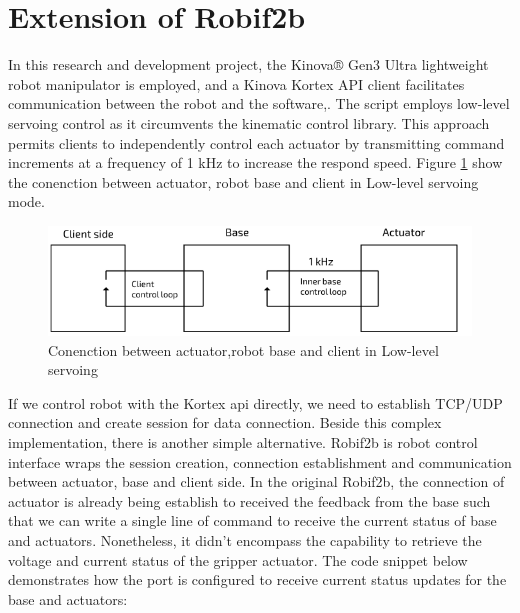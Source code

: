 \documentclass[report.tex]{subfiles}
\begin{document}
    \section{Extension of Robif2b}
    In this research and development project, the Kinova® Gen3 Ultra lightweight robot manipulator is employed, and a Kinova Kortex API client facilitates communication between the robot and the software\cite{Kinovaapi},\cite{KINOVA_userguide}. The script employs low-level servoing control as it circumvents the kinematic control library. This approach permits clients to independently control each actuator by transmitting command increments at a frequency of 1 kHz to increase the respond speed. Figure \ref{fig:kinova_low} show the conenction between actuator, robot base and client in Low-level servoing mode.\begin{figure}[h!]
        \centering
        \includegraphics[width=1\linewidth]{images/kinovalowlevel.png}
        \caption{Conenction between actuator,robot base and client in Low-level servoing}
        \label{fig:kinova_low}
    \end{figure}
    If we control robot with the Kortex api directly, we need to establish TCP/UDP connection and create session for data connection. Beside this complex implementation, there is another simple alternative. Robif2b is robot control interface wraps the session creation, connection establishment and communication between actuator, base and client side\cite{Rosym-Project}. In the original Robif2b, the connection of actuator is already being establish to received the feedback from the base such that we can write a single line of command to receive the current status of base and actuators. Nonetheless, it didn't encompass the capability to retrieve the voltage and current status of the gripper actuator. The code snippet below demonstrates how the port is configured to receive current status updates for the base and actuators:
\end{document}
